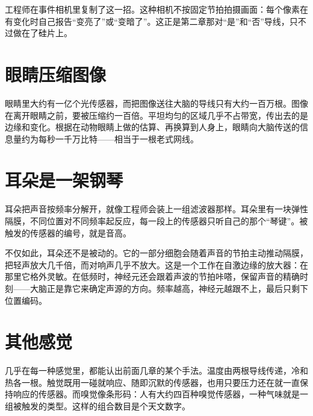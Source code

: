 工程师在事件相机里复制了这一招。这种相机不按固定节拍拍摄画面：每个像素在有变化时自己报告“变亮了”或“变暗了”。这正是第二章那对“是”和“否”导线，只不过做在了硅片上。

\section*{眼睛压缩图像}

眼睛里大约有一亿个光传感器，而把图像送往大脑的导线只有大约一百万根。图像在离开眼睛之前，要被压缩约一百倍。平坦均匀的区域几乎不占带宽，传出去的是边缘和变化。根据在动物眼睛上做的估算、再换算到人身上，眼睛向大脑传送的信息量约为每秒一千万比特——相当于一根老式网线。

\section*{耳朵是一架钢琴}

耳朵把声音按频率分解开，就像工程师会装上一组滤波器那样。耳朵里有一块弹性隔膜，不同位置对不同频率起反应，每一段上的传感器只听自己的那个“琴键”。被触发的传感器的编号，就是音高。


不仅如此，耳朵还不是被动的。它的一部分细胞会随着声音的节拍主动推动隔膜，把轻声放大几千倍，而对响声几乎不放大。这是一个工作在自激边缘的放大器：在那里它格外灵敏。在低频时，神经元还会跟着声波的节拍咔嗒，保留声音的精确时刻——大脑正是靠它来确定声源的方向。频率越高，神经元越跟不上，最后只剩下位置编码。

\section*{其他感觉}

几乎在每一种感觉里，都能认出前面几章的某个手法。温度由两根导线传递，冷和热各一根。触觉既用一碰就响应、随即沉默的传感器，也用只要压力还在就一直保持响应的传感器。而嗅觉像条形码：人有大约四百种嗅觉传感器，一种气味就是一组被触发的类型。这样的组合数目是个天文数字。


